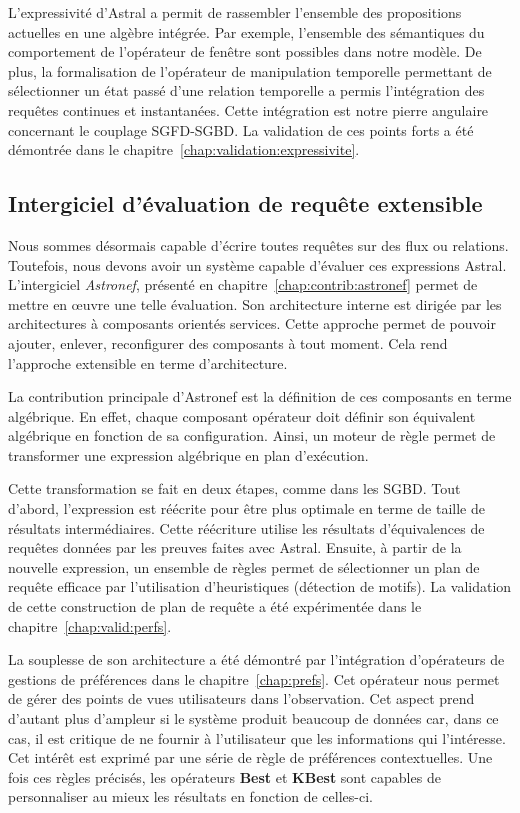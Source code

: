 L'expressivité d'Astral a permit de rassembler l'ensemble des propositions actuelles en une algèbre intégrée. Par exemple, l'ensemble des sémantiques du comportement de l'opérateur de fenêtre sont possibles dans notre modèle. De plus, la formalisation de l'opérateur de manipulation temporelle permettant de sélectionner un état passé d'une relation temporelle a permis l'intégration des requêtes continues et instantanées. Cette intégration est notre pierre angulaire concernant le couplage SGFD-SGBD. La validation de ces points forts a été démontrée dans le chapitre~\ref{chap:validation:expressivite}.

\subsection{Intergiciel d'évaluation de requête extensible}
Nous sommes désormais capable d'écrire toutes requêtes sur des flux ou relations. Toutefois, nous devons avoir un système capable d'évaluer ces expressions Astral. L'intergiciel \textit{Astronef}, présenté en chapitre~\ref{chap:contrib:astronef} permet de mettre en œuvre une telle évaluation. Son architecture interne est dirigée par les architectures à composants orientés services. Cette approche permet de pouvoir ajouter, enlever, reconfigurer des composants à tout moment. Cela rend l'approche extensible en terme d'architecture.

La contribution principale d'Astronef est la définition de ces composants en terme algébrique. En effet, chaque composant opérateur doit définir son équivalent algébrique en fonction de sa configuration. Ainsi, un moteur de règle permet de transformer une expression algébrique en plan d'exécution.

Cette transformation se fait en deux étapes, comme dans les SGBD. Tout d'abord, l'expression est réécrite pour être plus optimale en terme de taille de résultats intermédiaires. Cette réécriture utilise les résultats d'équivalences de requêtes données par les preuves faites avec Astral. Ensuite, à partir de la nouvelle expression, un ensemble de règles permet de sélectionner un plan de requête efficace par l'utilisation d'heuristiques (détection de motifs). La validation de cette construction de plan de requête a été expérimentée dans le chapitre~\ref{chap:valid:perfs}. 

La souplesse de son architecture a été démontré par l'intégration d'opérateurs de gestions de préférences dans le chapitre~\ref{chap:prefs}. Cet opérateur nous permet de gérer des points de vues utilisateurs dans l'observation. Cet aspect prend d'autant plus d'ampleur si le système produit beaucoup de données car, dans ce cas, il est critique de ne fournir à l'utilisateur que les informations qui l'intéresse. Cet intérêt est exprimé par une série de règle de préférences contextuelles. Une fois ces règles précisés, les opérateurs \textbf{Best} et \textbf{KBest} sont capables de personnaliser au mieux les résultats en fonction de celles-ci.

